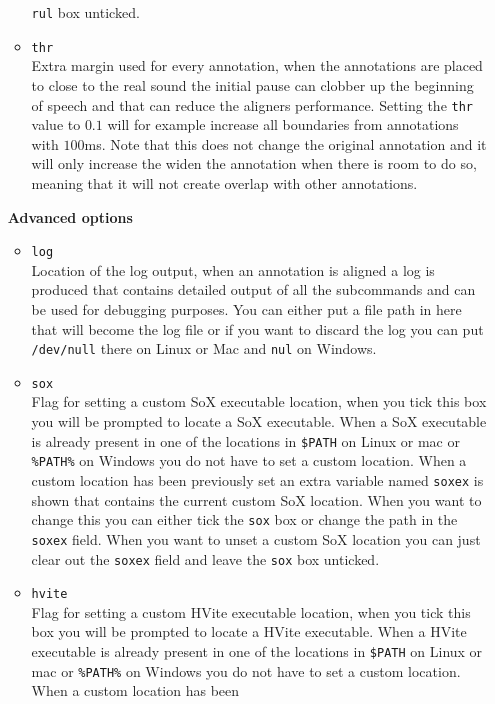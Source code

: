 \begin{itemize}
\begin{itemize}
				\texttt{rul} box unticked.
			\item \texttt{thr}\\
				Extra margin used for every annotation, when the annotations are placed
				to close to the real sound the initial pause can clobber up the
				beginning of speech and that can reduce the aligners performance.
				Setting the \texttt{thr} value to $0.1$ will for example increase all
				boundaries from annotations with $100$ms. Note that this does not
				change the original annotation and it will only increase the widen the
				annotation when there is room to do so, meaning that it will not create
				overlap with other annotations.
		\end{itemize}

		\textbf{Advanced options}
		\begin{itemize}
			\item \texttt{log}\\
				Location of the log output, when an annotation is aligned a log is
				produced that contains detailed output of all the subcommands and can
				be used for debugging purposes. You can either put a file path in here
				that will become the log file or if you want to discard the log you can
				put \texttt{/dev/null} there on Linux or Mac and \texttt{nul} on
				Windows.
			\item \texttt{sox}\\
				Flag for setting a custom SoX executable location, when you tick this
				box you will be prompted to locate a SoX executable. When a SoX
				executable is already present in one of the locations in
				\texttt{\$PATH} on Linux or mac or \texttt{\%PATH\%} on Windows you do
				not have to set a custom location. When a custom location has been
				previously set an extra variable named \texttt{soxex} is shown that
				contains the current custom SoX location. When you want to change this
				you can either tick the \texttt{sox} box or change the path in the
				\texttt{soxex} field.  When you want to unset a custom SoX location you
				can just clear out the \texttt{soxex} field and leave the \texttt{sox}
				box unticked.
			\item \texttt{hvite}\\
				Flag for setting a custom HVite executable location, when you tick this
				box you will be prompted to locate a HVite executable. When a HVite
				executable is already present in one of the locations in
				\texttt{\$PATH} on Linux or mac or \texttt{\%PATH\%} on Windows you do
				not have to set a custom location. When a custom location has been

\end{itemize}
\end{itemize}
